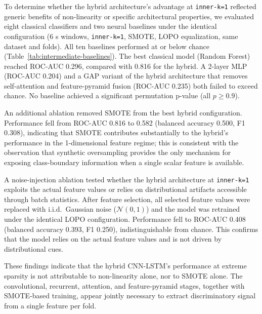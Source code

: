 To determine whether the hybrid architecture's advantage at \texttt{inner-k=1} reflected generic benefits of non-linearity or specific architectural properties, we evaluated eight classical classifiers and two neural baselines under the identical configuration (6 s windows, \texttt{inner-k=1}, SMOTE, LOPO equalization, same dataset and folds). All ten baselines performed at or below chance (Table~\ref{tab:intermediate-baselines}). The best classical model (Random Forest) reached ROC-AUC 0.296, compared with 0.816 for the hybrid. A 2-layer MLP (ROC-AUC 0.204) and a GAP variant of the hybrid architecture that removes self-attention and feature-pyramid fusion (ROC-AUC 0.235) both failed to exceed chance. No baseline achieved a significant permutation p-value (all $p \ge 0.9$).

An additional ablation removed SMOTE from the best hybrid configuration. Performance fell from ROC-AUC 0.816 to 0.582 (balanced accuracy 0.500, F1 0.308), indicating that SMOTE contributes substantially to the hybrid's performance in the 1-dimensional feature regime; this is consistent with the observation that synthetic oversampling provides the only mechanism for exposing class-boundary information when a single scalar feature is available.

A noise-injection ablation tested whether the hybrid architecture at \texttt{inner-k=1} exploits the actual feature values or relies on distributional artifacts accessible through batch statistics. After feature selection, all selected feature values were replaced with i.i.d.\ Gaussian noise ($\mathcal{N}(0, 1)$) and the model was retrained under the identical LOPO configuration. Performance fell to ROC-AUC 0.408 (balanced accuracy 0.393, F1 0.250), indistinguishable from chance. This confirms that the model relies on the actual feature values and is not driven by distributional cues.

These findings indicate that the hybrid CNN-LSTM's performance at extreme sparsity is not attributable to non-linearity alone, nor to SMOTE alone. The convolutional, recurrent, attention, and feature-pyramid stages, together with SMOTE-based training, appear jointly necessary to extract discriminatory signal from a single feature per fold.

\begin{paperwidetable}
  \centering
  \caption{Intermediate baseline classifiers and ablations evaluated at the best hybrid configuration (6~s, \texttt{inner-k=1}). All models used identical data, feature selection, and validation splits. Neural baselines and ablation trained on NVIDIA RTX 3090.}
  \label{tab:intermediate-baselines}
  \footnotesize
  
\end{paperwidetable}

